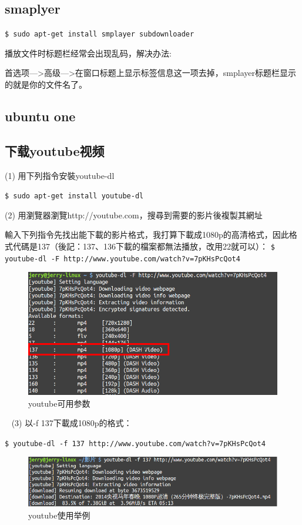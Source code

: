 \subsection{smaplyer}
\verb"$ sudo apt-get install smplayer subdownloader"

播放文件时标题栏经常会出现乱码，解决办法:

首选项—>高级—>在窗口标题上显示标签信息这一项去掉，smplayer标题栏显示的就是你的文件名了。

\subsection{ubuntu one}

\subsection{下载youtube视频}
(1) 用下列指令安裝youtube-dl

\verb"$ sudo apt-get install youtube-dl"

(2) 用瀏覽器瀏覽http://youtube.com，搜尋到需要的影片後複製其網址

輸入下列指令先找出能下載的影片格式，我打算下載成1080p的高清格式，因此格式代碼是137（後記：137、136下載的檔案都無法播放，改用22就可以）：
\verb"$ youtube-dl -F http://www.youtube.com/watch?v=7pKHsPcQot4"
\begin{figure}
\centering\includegraphics[scale=0.5]{figures/youtube.png}
\caption{youtube可用参数}\label{youtube1}
\end{figure} 
(3) 以-f 137下載成1080p的格式：

\verb"$ youtube-dl -f 137 http://www.youtube.com/watch?v=7pKHsPcQot4"
\begin{figure}
\centering\includegraphics[scale=0.5]{figures/youtube1.png}
\caption{youtube使用举例}\label{youtube2}
\end{figure} 

